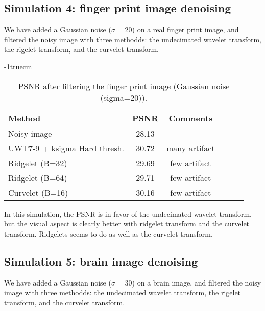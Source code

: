 \documentclass[11pt,a4paper]{article}
\begin{document}
\clearpage

\subsection{Simulation 4: finger print image denoising}
We have added a Gaussian noise ($\sigma=20$) on a real finger print image,
and filtered the noisy image with three methodds: the undecimated wavelet
transform, the rigelet transform, and the curvelet transform.

\voffset -1truecm
\begin{table}[htb]
\begin{center}
\begin{tabular}{lccccc} \hline \hline
Method                          & PSNR   &  Comments   \\ \hline \hline
Noisy image                     & 28.13  &     \\
UWT7-9 + ksigma  Hard thresh.   & 30.72  &    many artifact \\
Ridgelet (B=32)                 & 29.69  &    few artifact \\
Ridgelet (B=64)                 & 29.71  &    few artifact  \\
Curvelet (B=16)                 & 30.16  &    few artifact  \\ \hline \hline
\end{tabular}
\caption{PSNR after filtering the finger print image (Gaussian noise (sigma=20)).}
\vspace{0.5cm}
\label{comptab2}
\end{center}
\end{table}

In this simulation, the PSNR is in favor of the undecimated wavelet transform,
but the visual aspect is clearly better with ridgelet transform and the
curvelet transform. Ridgelets seems to do as well as the curvelet transform.

\subsection{Simulation 5: brain image denoising}
We have added a Gaussian noise ($\sigma=30$) on a brain image,
and filtered the noisy image with three methodds: the undecimated wavelet
transform, the rigelet transform, and the curvelet transform. 
\end{document}

